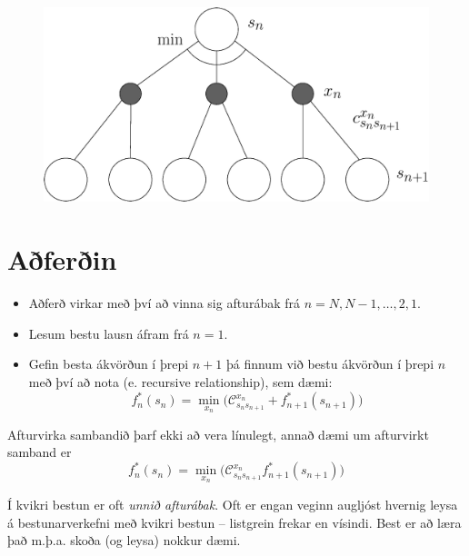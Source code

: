 \begin{center}
\begin{figure}[h!]
  \includegraphics[width=0.9\columnwidth]{figs/stateaction.eps}
\end{figure}
\end{center}

\section{Aðferðin}
\begin{itemize}
\item Aðferð virkar með því að vinna sig afturábak frá  $n=N,N-1,\ldots,2,1$. 
\item Lesum bestu lausn áfram frá $n=1$.
\item Gefin besta ákvörðun í þrepi $n+1$ þá finnum við bestu ákvörðun í þrepi $n$ með því að nota  (e. recursive relationship), sem dæmi: 
$$f_n^*(s_n) = \min_{x_n} \Big(\mathcal{C}_{s_ns_{n+1}}^{x_n}+ f_{n+1}^*(s_{n+1})\Big)$$
\end{itemize}
\newpage
\begin{samepage}
\begin{aths}Afturvirka sambandið þarf ekki að vera línulegt,  annað dæmi um afturvirkt samband er 
$$f_n^*(s_n) = \min_{x_n} \Big(\mathcal{C}_{s_ns_{n+1}}^{x_n} f_{n+1}^*(s_{n+1})\Big)$$
 \end{aths}
\end{samepage}


Í kvikri bestun er oft \emph{unnið afturábak}. Oft er engan veginn augljóst hvernig leysa á bestunarverkefni með kvikri bestun -- listgrein frekar en vísindi. Best er að læra það m.þ.a. skoða (og leysa) nokkur dæmi.


